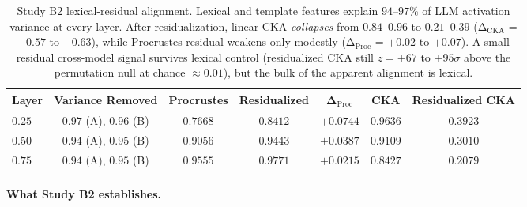 \begin{table}[h]
\centering
\caption{Study B2 lexical-residual alignment. Lexical and template
features explain $94$--$97\%$ of LLM activation variance at every
layer. After residualization, linear CKA \emph{collapses} from
$0.84$--$0.96$ to $0.21$--$0.39$ (Δ$_\text{CKA}$ = $-0.57$ to
$-0.63$), while Procrustes residual weakens only modestly
(Δ$_\text{Proc}$ = $+0.02$ to $+0.07$). A small residual cross-model
signal survives lexical control (residualized CKA still $z = +67$ to
$+95\sigma$ above the permutation null at chance $\approx 0.01$), but
the bulk of the apparent alignment is lexical.}
\label{tab:study-b-prime}
\begin{tabular}{l c c c c c c}
\toprule
Layer & Variance Removed & Procrustes & Residualized & Δ$_\text{Proc}$ & CKA & Residualized CKA \\
\midrule
$0.25$ & $0.97$ (A), $0.96$ (B) & $0.7668$ & $0.8412$ & $+0.0744$ & $0.9636$ & $\mathbf{0.3923}$ \\
$0.50$ & $0.94$ (A), $0.95$ (B) & $0.9056$ & $0.9443$ & $+0.0387$ & $0.9109$ & $\mathbf{0.3010}$ \\
$0.75$ & $0.94$ (A), $0.95$ (B) & $0.9555$ & $0.9771$ & $+0.0215$ & $0.8427$ & $\mathbf{0.2079}$ \\
\bottomrule
\end{tabular}
\end{table}

\paragraph{What Study B2 establishes.}

